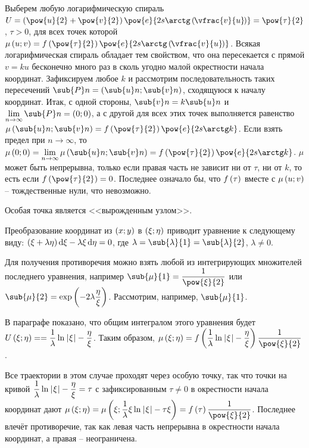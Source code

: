 \documentclass[a5paper,10pt]{article}
\begin{document}
Выберем любую логарифмическую спираль 
$U = \br{\pow{u}{2} + \pow{v}{2}} \pow{e}{2s \arctg\br[-0.1em]{\vfrac {v} {u}}} = 
\pow{\tau}{2}$, $\tau > 0$, 
для всех точек которой 
$\mu\br{u; v} = f\br{\pow{\tau}{2}} \pow{e}{2s \arctg\br[-0.1em]{\vfrac {v} {u}}}$.
Всякая логарифмическая спираль обладает тем свойством, что она пересекается с прямой 
$v = ku$ бесконечно много раз в сколь угодно малой окрестности начала координат. 
Зафиксируем любое $k$ и рассмотрим последовательность таких пересечений 
$\sub{P}n = \br{\sub{u}n; \sub{v}n}$, сходящуюся к началу координат.
Итак, с одной стороны, $\sub{v}n = k \sub{u}n$ и $\tlim{n \to \infty} {\sub{P}n} = \br{0; 0}$,
а с другой для всех этих точек выполняется равенство
$\mu\br{\sub{u}n; \sub{v}n} = f\br{\pow{\tau}{2}} \pow{e}{2s \arctg k}$.
Если взять предел при $n \to \infty$, то
$\mu\br{0; 0} = \tlim{n \to \infty} \mu\br{\sub{u}n; \sub{v}n}
= f\br{\pow{\tau}{2}} \pow{e}{2s \arctg k}$. 
$\mu$ может быть непрерывна, только если правая часть не зависит ни от $\tau$, ни от $k$, 
то есть если $f\br{\pow{\tau}{2}} = 0$. Последнее означало бы, что $f\left(\hspace{0.01em}\tau\hspace{0.01em}\right)$ 
вместе с $\mu\left(\hspace{0.01em}u; v\hspace{0.01em}\right)$ -- тождественные нули, что невозможно.

\begin{case}[3]
    Особая точка является <<вырожденным узлом>>.
\end{case}

Преобразование координат из $\left(\hspace{0.01em}x; y\hspace{0.01em}\right)$ в $\left(\hspace{0.01em}\xi; \eta\hspace{0.01em}\right)$ приводит уравнение к следующему виду: 
$\br{\xi + \lambda \eta} \di \xi - \lambda \xi \di \eta = 0$,
где $\lambda = \sub{\lambda}{1} = \sub{\lambda}{2}$, $\lambda \ne 0$.

Для получения противоречия можно взять любой из интегрирующих множителей последнего уравнения,
например $\sub{\mu}{1} = \dfrac {1} {\pow{\xi}{2}}$ или $\sub{\mu}{2} = \exp\br{-2\lambda \dfrac {\eta} {\xi}}$. Рассмотрим, например, $\sub{\mu}{1}$.

В параграфе показано, что общим интегралом этого уравнения будет 
$U\br{\xi; \eta} = \linebreak = \dfrac {1}{\lambda} \ln \vbr{\xi} - \dfrac {\eta}{\xi}$.
Таким образом, $\mu\br{\xi; \eta} 
= f\br{\dfrac {1}{\lambda} \ln \vbr{\xi} - \dfrac {\eta}{\xi}} \dfrac {1} {\pow{\xi}{2}}$.

Все траектории в этом случае проходят через особую точку, так что точки на кривой 
$\dfrac {1}{\lambda} \ln \hspace{0.2mm}\left|\hspace{0.06em}\xi\hspace{0.06em}\right| - \dfrac {\eta}{\xi} = \tau$ с зафиксированным
$\tau \ne 0$ в окрестности начала координат дают
$\mu\br{\xi; \eta} = \mu\br{\xi; \dfrac {1} {\lambda} \xi \ln\vbr{\xi} - \tau \xi} 
= f\br{\tau} \dfrac {1} {\pow{\xi}{2}}$.
Последнее влечёт противоречие, так как левая часть непрерывна в окрестности начала координат,
а правая -- неограничена.
 
\end{document}
